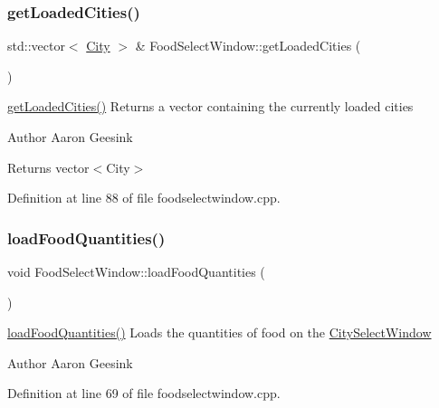 \subsubsection{\texorpdfstring{getLoadedCities()}{getLoadedCities()}}
{\footnotesize\ttfamily std\+::vector$<$ \mbox{\hyperlink{class_city}{City}} $>$ \& Food\+Select\+Window\+::get\+Loaded\+Cities (\begin{DoxyParamCaption}{ }\end{DoxyParamCaption})}



\mbox{\hyperlink{class_food_select_window_a2a32ba559351db37a46af24cad9cba5d}{get\+Loaded\+Cities()}} Returns a vector containing the currently loaded cities 

\begin{DoxyAuthor}{Author}
Aaron Geesink 
\end{DoxyAuthor}
\begin{DoxyReturn}{Returns}
vector$<$\+City$>$ 
\end{DoxyReturn}


Definition at line 88 of file foodselectwindow.\+cpp.

\mbox{\label{class_food_select_window_a608403f9ed5796c1a1d0ac034296bc05}} 
\subsubsection{\texorpdfstring{loadFoodQuantities()}{loadFoodQuantities()}}
{\footnotesize\ttfamily void Food\+Select\+Window\+::load\+Food\+Quantities (\begin{DoxyParamCaption}{ }\end{DoxyParamCaption})}



\mbox{\hyperlink{class_food_select_window_a608403f9ed5796c1a1d0ac034296bc05}{load\+Food\+Quantities()}} Loads the quantities of food on the \mbox{\hyperlink{class_city_select_window}{City\+Select\+Window}} 

\begin{DoxyAuthor}{Author}
Aaron Geesink 
\end{DoxyAuthor}


Definition at line 69 of file foodselectwindow.\+cpp.

\mbox{\label{class_food_select_window_a0d2bb2f7e07f62e62c2920d989415d8c}} 
